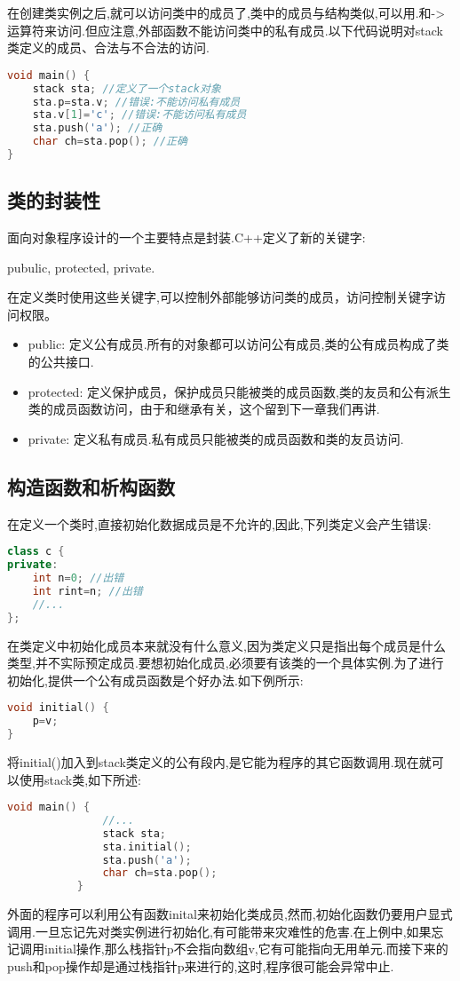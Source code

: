 \documentclass{article}
\begin{document}
在创建类实例之后,就可以访问类中的成员了,类中的成员与结构类似,可以用.和->运算符来访问.但应注意,外部函数不能访问类中的私有成员.以下代码说明对stack类定义的成员、合法与不合法的访问.
\begin{lstlisting}[language=c++]
void main() {
    stack sta; //定义了一个stack对象
    sta.p=sta.v; //错误:不能访问私有成员
    sta.v[1]='c'; //错误:不能访问私有成员
    sta.push('a'); //正确
    char ch=sta.pop(); //正确
}
\end{lstlisting}
\subsection{类的封装性}
\label{sec-1-3}

面向对象程序设计的一个主要特点是封装.C++定义了新的关键字: 

pubulic, protected, private.

在定义类时使用这些关键字,可以控制外部能够访问类的成员，访问控制关键字访问权限。
\begin{itemize}
\itemsep=-3pt
\item public:    定义公有成员.所有的对象都可以访问公有成员,类的公有成员构成了类的公共接口.
\item protected:  定义保护成员，保护成员只能被类的成员函数,类的友员和公有派生类的成员函数访问，由于和继承有关，这个留到下一章我们再讲.
\item private:   定义私有成员.私有成员只能被类的成员函数和类的友员访问. 
\end{itemize}
\subsection{构造函数和析构函数}
\label{sec-1-4}

在定义一个类时,直接初始化数据成员是不允许的,因此,下列类定义会产生错误:
\begin{lstlisting}[language=c++]
class c {
private:
    int n=0; //出错
    int rint=n; //出错
    //...
};
\end{lstlisting}
在类定义中初始化成员本来就没有什么意义,因为类定义只是指出每个成员是什么类型,并不实际预定成员.要想初始化成员,必须要有该类的一个具体实例.为了进行初始化,提供一个公有成员函数是个好办法.如下例所示:
\begin{lstlisting}[language=c++]
void initial() {   
    p=v;
} 
\end{lstlisting}
将initial()加入到stack类定义的公有段内,是它能为程序的其它函数调用.现在就可以使用stack类,如下所述:
\begin{lstlisting}[language=c++]
           void main() {           
               //...
               stack sta;
               sta.initial();
               sta.push('a');
               char ch=sta.pop();
           }
\end{lstlisting}
外面的程序可以利用公有函数inital来初始化类成员,然而,初始化函数仍要用户显式调用.一旦忘记先对类实例进行初始化,有可能带来灾难性的危害.在上例中,如果忘记调用initial操作,那么栈指针p不会指向数组v,它有可能指向无用单元.而接下来的push和pop操作却是通过栈指针p来进行的,这时,程序很可能会异常中止.
\end{document}
